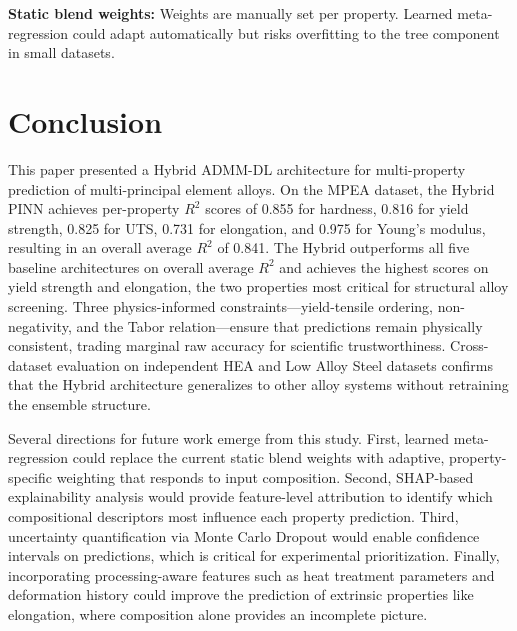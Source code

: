 \documentclass[conference]{IEEEtran}
\begin{document}
\textbf{Static blend weights:} Weights are manually set per property. Learned meta-regression could adapt automatically but risks overfitting to the tree component in small datasets.

\section{Conclusion}

This paper presented a Hybrid ADMM-DL architecture for multi-property prediction of multi-principal element alloys. On the MPEA dataset, the Hybrid PINN achieves per-property $R^2$ scores of 0.855 for hardness, 0.816 for yield strength, 0.825 for UTS, 0.731 for elongation, and 0.975 for Young's modulus, resulting in an overall average $R^2$ of 0.841. The Hybrid outperforms all five baseline architectures on overall average $R^2$ and achieves the highest scores on yield strength and elongation, the two properties most critical for structural alloy screening. Three physics-informed constraints---yield-tensile ordering, non-negativity, and the Tabor relation---ensure that predictions remain physically consistent, trading marginal raw accuracy for scientific trustworthiness. Cross-dataset evaluation on independent HEA and Low Alloy Steel datasets confirms that the Hybrid architecture generalizes to other alloy systems without retraining the ensemble structure.

Several directions for future work emerge from this study. First, learned meta-regression could replace the current static blend weights with adaptive, property-specific weighting that responds to input composition. Second, SHAP-based explainability analysis would provide feature-level attribution to identify which compositional descriptors most influence each property prediction. Third, uncertainty quantification via Monte Carlo Dropout would enable confidence intervals on predictions, which is critical for experimental prioritization. Finally, incorporating processing-aware features such as heat treatment parameters and deformation history could improve the prediction of extrinsic properties like elongation, where composition alone provides an incomplete picture.
\end{document}
